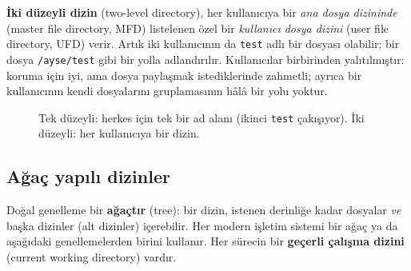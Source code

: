 \documentclass[11pt,a4paper]{article}
\newcommand{\term}[1]{\textbf{\color{mintdeep}#1}}
\begin{document}
\term{İki düzeyli dizin} (two-level directory), her kullanıcıya bir \emph{ana dosya dizininde} (master file directory, MFD) listelenen özel bir \emph{kullanıcı dosya dizini} (user file directory, UFD) verir. Artık iki kullanıcının da \texttt{test} adlı bir dosyası olabilir; bir dosya \texttt{/ayse/test} gibi bir yolla adlandırılır. Kullanıcılar birbirinden yalıtılmıştır: koruma için iyi, ama dosya paylaşmak istediklerinde zahmetli; ayrıca bir kullanıcının kendi dosyalarını gruplamasının hâlâ bir yolu yoktur.

\begin{figure}[H]
\centering
{}
\caption{Tek düzeyli: herkes için tek bir ad alanı (ikinci \texttt{test} çakışıyor). İki düzeyli: her kullanıcıya bir dizin.}
\end{figure}

\subsection{Ağaç yapılı dizinler}

Doğal genelleme bir \term{ağaçtır} (tree): bir dizin, istenen derinliğe kadar dosyalar \emph{ve} başka dizinler (alt dizinler) içerebilir. Her modern işletim sistemi bir ağaç ya da aşağıdaki genellemelerden birini kullanır. Her sürecin bir \term{geçerli çalışma dizini} (current working directory) vardır.
\end{document}
